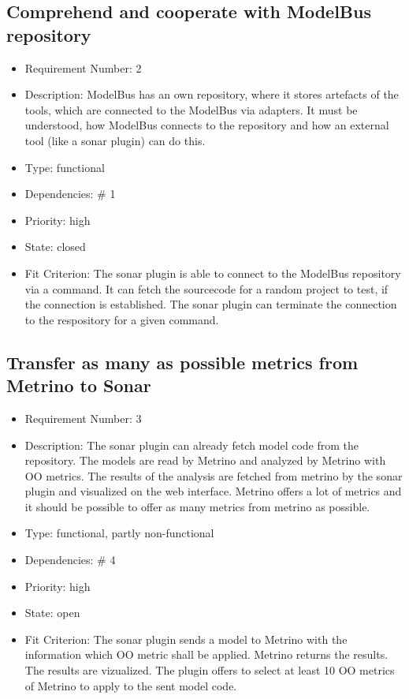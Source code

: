 \subsection{Comprehend and cooperate with ModelBus repository}
\begin{itemize}
\item Requirement Number: 2
\item Description: ModelBus has an own repository, where it stores artefacts of the tools, which are connected to the ModelBus via adapters. It must be understood, how ModelBus connects to the repository and how an external tool (like a sonar plugin) can do this.
\item Type: functional
\item Dependencies: \# 1
\item Priority: high
\item State: closed
\item Fit Criterion: The sonar plugin is able to connect to the ModelBus repository via a command. It can fetch the sourcecode for a random project to test, if the connection is established. The sonar plugin can terminate the connection to the respository for a given command.
\end{itemize}

\subsection{Transfer as many as possible metrics from Metrino to Sonar}
\begin{itemize}
\item Requirement Number: 3
\item Description: The sonar plugin can already fetch model code from the repository. The models are read by Metrino and analyzed by Metrino with OO metrics. The results of the analysis are fetched from metrino by the sonar plugin and visualized on the web interface. Metrino offers a lot of metrics and it should be possible to offer as many metrics from metrino as possible.
\item Type: functional, partly non-functional
\item Dependencies: \# 4
\item Priority: high
\item State: open
\item Fit Criterion: The sonar plugin sends a model to Metrino with the information which OO metric shall be applied. Metrino returns the results. The results are vizualized. The plugin offers to select at least 10 OO metrics of Metrino to apply to the sent model code.
\end{itemize}

